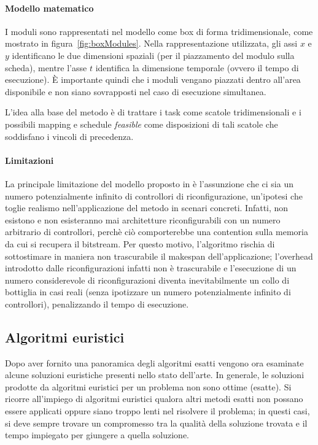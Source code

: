 \paragraph{Modello matematico}
I moduli sono rappresentati nel modello come box di forma tridimensionale, come 
mostrato in figura~\ref{fig:boxModules}. Nella rappresentazione utilizzata, gli 
assi $x$ e $y$ identificano le due dimensioni spaziali (per il piazzamento del 
modulo sulla scheda), mentre l'asse $t$ identifica la dimensione temporale 
(ovvero il tempo di esecuzione). È importante quindi che i moduli vengano 
piazzati dentro all'area disponibile e non siano sovrapposti nel caso di esecuzione
simultanea.

L'idea alla base del metodo è di trattare i task come scatole tridimensionali e 
i possibili mapping e schedule \emph{feasible} come disposizioni di tali scatole che 
soddisfano i vincoli di precedenza.


\paragraph{Limitazioni}
La principale limitazione del modello proposto in \cite{FeketeOptimal} è 
l'assunzione che ci sia un numero potenzialmente infinito di controllori di 
riconfigurazione, un'ipotesi che toglie realismo nell'applicazione del metodo 
in scenari concreti. Infatti, non esistono e non esisteranno mai architetture
riconfigurabili con un numero arbitrario di controllori, perch\`e ci\`o comporterebbe
una contention sulla memoria da cui si recupera il bitstream.
Per questo motivo, l'algoritmo \cite{FeketeOptimal} rischia di sottostimare in maniera
non trascurabile il makespan dell'applicazione; l'overhead introdotto dalle riconfigurazioni
infatti non è trascurabile e l'esecuzione di un numero considerevole di riconfigurazioni 
diventa inevitabilmente un collo di bottiglia in casi reali (senza ipotizzare un numero
potenzialmente infinito di controllori), penalizzando il tempo di 
esecuzione.


\subsection{Algoritmi euristici}
\label{sec:algoritmiEuristici}
Dopo aver fornito una panoramica degli algoritmi esatti vengono ora esaminate 
alcune soluzioni euristiche presenti nello stato dell'arte. In generale, le 
soluzioni prodotte da algoritmi euristici per un problema non sono ottime 
(esatte). Si ricorre all'impiego di algoritmi euristici qualora altri metodi 
esatti non possano essere applicati oppure siano troppo lenti nel risolvere il 
problema; in questi casi, si deve sempre trovare un compromesso tra la 
qualità della soluzione trovata e il tempo impiegato per giungere a quella 
soluzione.


